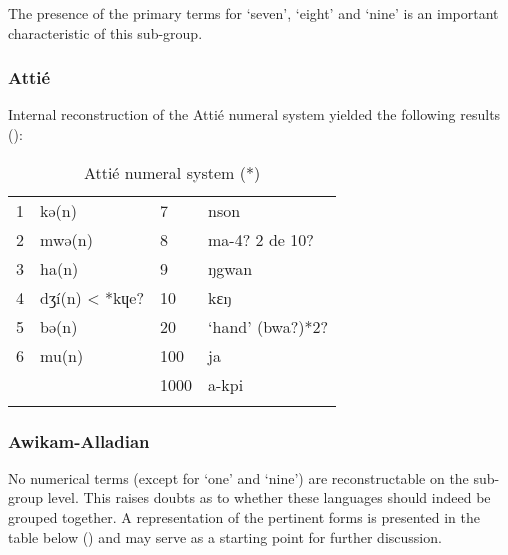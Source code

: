 The presence of the primary terms for ‘seven’, ‘eight’ and ‘nine’ is an important characteristic of this sub-group. 

\subsubsection{Attié}%
Internal reconstruction of the Attié numeral system yielded the following results ():

\begin{table}
\caption{\label{tab:3:70}Attié numeral system (*)}


\begin{tabularx}{\textwidth}{lXlX}
\lsptoprule

1 & kə(n) & 7 & nson\\
2 & mwə(n) & 8 & ma-4? 2 de 10?\\
3 & ha(n) & 9 & ŋgwan\\
4 & dʒí(n) < *kɥe? & 10 & kɛŋ\\
5 & bə(n) & 20 & ‘hand' (bwa?)*2?\\
6 & mu(n) & 100 & ja\\
~ &  & 1000 & a-kpi\\
\lspbottomrule
\end{tabularx}
\end{table}

\subsubsection{Awikam-Alladian}%
No numerical terms (except for ‘one’ and `nine') are reconstructable on the sub-group level. This raises doubts as to whether these languages should indeed be grouped together. A representation of the pertinent forms is presented in the table below () and may serve as a starting point for further discussion.

